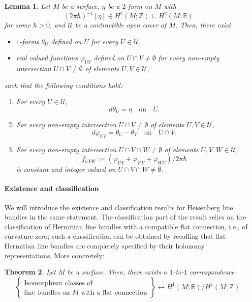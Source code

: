 \documentclass{amsart}
\newtheorem{theorem}{Theorem}[section]
\newtheorem{lemma}[theorem]{Lemma}
\theoremstyle{definition}
\theoremstyle{remark}
\numberwithin{equation}{section}
\newcommand{\<}{{\langle}}
\renewcommand{\>}{{\rangle}}
\begin{document}
\begin{lemma}
    \label{lem:weil}
    Let $M$ be a surface, $\eta$ be a $2$-form on $M$ with $$(2\pi\hbar)^{-1}[\eta] \in H^2(M;\mathbb{Z}) \subseteq H^2(M;\mathbb{R})$$ for some $\hbar > 0$, and $\mathcal{U}$ be a contractible open cover of $M$. Then, there exist 
    \begin{itemize}
        \item $1$-forms $\theta_U$ defined on $U$ for every $U \in \mathcal{U}$,
        \item real valued functions $\varphi_{UV}$ defined on $U \cap V \neq \emptyset$ for every non-empty intersection $U\cap V \neq \emptyset$ of elements $U,V \in \mathcal{U}$,
    \end{itemize}
     such that the following conditions hold:
    \begin{enumerate}
        \item For every $U \in \mathcal{U}$,
        \[
        d\theta_U = \eta \quad \text{on} \quad U.
        \]
        \item For every non-empty intersection $U\cap V \neq \emptyset$ of elements $U,V \in \mathcal{U}$,
        \[
        d\varphi_{UV} = \theta_U  - \theta_V \quad \text{on} \quad U\cap V.
        \]
        \item For every non-empty intersection $U \cap V \cap W \neq \emptyset$ of elements $U,V,W \in \mathcal{U}$,
        \[
        f_{UVW} := (\varphi_{UV} + \varphi_{VW} + \varphi_{WU})/2\pi\hbar
        \]
        is constant and integer valued on $U \cap V \cap W \neq \emptyset$.
    \end{enumerate}
\end{lemma}

\paragraph*{\bf Existence and classification} We will introduce the existence and classification results for Heisenberg line bundles in the same statement. The classification part of the result relies on the classification of Hermitian line bundles with a compatible flat connection, i.e., of curvature zero; such a classification can be obtained by recalling that flat Hermitian line bundles are completely specified by their holonomy representations. More concretely:

\begin{theorem}
    \label{theo:flat}
    Let $M$ be a surface. Then, there exists a $1$-to-$1$ correspondence
    \[
    \left\lbrace \begin{array}{c}
         \text{Isomorphism classes of } \\
         \text{line bundles on $M$ with a flat connection}
    \end{array}
    \right\rbrace \longleftrightarrow H^1(M;\mathbb{R})/H^1(M;\mathbb{Z}).
    \]
\end{theorem}
\end{document}
